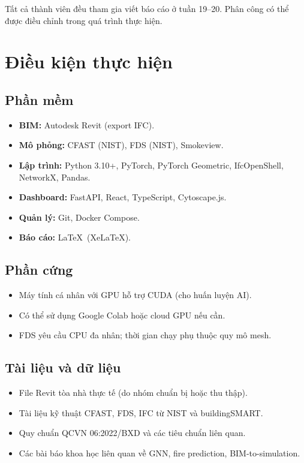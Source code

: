 \begin{notebox}
Tất cả thành viên đều tham gia viết báo cáo ở tuần 19--20. Phân công có thể được điều chỉnh trong quá trình thực hiện.
\end{notebox}

\clearpage

\section{Điều kiện thực hiện}
\label{sec:dieuken}

\subsection{Phần mềm}

\begin{itemize}
  \item \textbf{BIM:} Autodesk Revit (export IFC).
  \item \textbf{Mô phỏng:} CFAST (NIST), FDS (NIST), Smokeview.
  \item \textbf{Lập trình:} Python 3.10+, PyTorch, PyTorch Geometric, IfcOpenShell, NetworkX, Pandas.
  \item \textbf{Dashboard:} FastAPI, React, TypeScript, Cytoscape.js.
  \item \textbf{Quản lý:} Git, Docker Compose.
  \item \textbf{Báo cáo:} \LaTeX\ (XeLaTeX).
\end{itemize}

\subsection{Phần cứng}

\begin{itemize}
  \item Máy tính cá nhân với GPU hỗ trợ CUDA (cho huấn luyện AI).
  \item Có thể sử dụng Google Colab hoặc cloud GPU nếu cần.
  \item FDS yêu cầu CPU đa nhân; thời gian chạy phụ thuộc quy mô mesh.
\end{itemize}

\subsection{Tài liệu và dữ liệu}

\begin{itemize}
  \item File Revit tòa nhà thực tế (do nhóm chuẩn bị hoặc thu thập).
  \item Tài liệu kỹ thuật CFAST, FDS, IFC từ NIST và buildingSMART.
  \item Quy chuẩn QCVN 06:2022/BXD và các tiêu chuẩn liên quan.
  \item Các bài báo khoa học liên quan về GNN, fire prediction, BIM-to-simulation.
\end{itemize}
